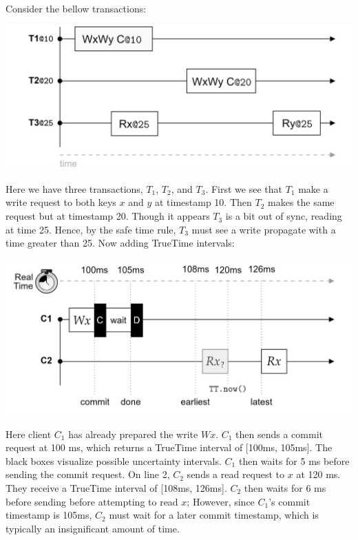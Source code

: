 \begin{Example}

    Consider the bellow transactions:
  
 
        \begin{center}
            
           \hspace{-3em} \includegraphics[width=.8\textwidth]{Sections/span/mvcc.png}
        \end{center}
        
    \noindent
    Here we have three transactions, $T_1$, $T_2$, and $T_3$. 
    First we see that $T_1$ make a write request to both keys $x$ and $y$ at timestamp 10.
    Then $T_2$ makes the same request but at timestamp 20. Though it appears $T_3$ is a bit out of sync, reading at 
    time 25. Hence, by the safe time rule, $T_3$ must see a write propagate with a time greater than 25. Now adding TrueTime intervals:
    \begin{center}
            
            \includegraphics[width=\textwidth]{Sections/span/mvcc_2.png}
        \end{center}
        \noindent
    
    \noindent
    Here client $C_1$ has already prepared the write $Wx$. $C_1$ then sends a commit request at 100 ms, which returns a TrueTime interval of [100ms, 105ms]. The black 
    boxes visualize possible uncertainty intervals. $C_1$ then waits for 5 ms before sending the commit request. On line 2, $C_2$ sends a read request to $x$ at 120 ms.
    They receive a TrueTime interval of [108ms, 126ms]. $C_2$ then waits for 6 ms before sending before attempting to read $x$;
    However, since $C_1$'s commit timestamp is 105ms, $C_2$ must wait for a later commit timestamp, which is typically an insignificant amount of time.
    \end{Example}
            
